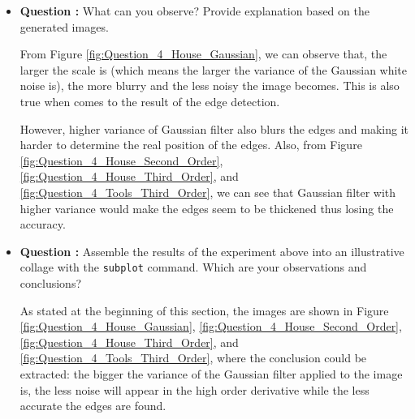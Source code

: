 \documentclass[11pt,a4paper]{article}
\begin{document}
	\begin{itemize}
		\item\addtocounter{Counter}{1}\textbf{Question :} What can you observe? Provide explanation based on the generated images.
			\par From Figure \ref{fig:Question_4_House_Gaussian}, we can observe that, the larger the scale is (which means the larger the variance of the Gaussian white noise is), the more blurry and the less noisy the image becomes. This is also true when comes to the result of the edge detection. 
			\par However, higher variance of Gaussian filter also blurs the edges and making it harder to determine the real position of the edges. Also, from Figure \ref{fig:Question_4_House_Second_Order}, \ref{fig:Question_4_House_Third_Order}, and \ref{fig:Question_4_Tools_Third_Order}, we can see that Gaussian filter with higher variance would make the edges seem to be thickened thus losing the accuracy.

		\item\addtocounter{Counter}{1}\textbf{Question :} Assemble the results of the experiment above into an illustrative collage with the \texttt{subplot} command. Which are your observations and conclusions?
			\par As stated at the beginning of this section, the images are shown in Figure \ref{fig:Question_4_House_Gaussian}, \ref{fig:Question_4_House_Second_Order}, \ref{fig:Question_4_House_Third_Order}, and \ref{fig:Question_4_Tools_Third_Order}, where the conclusion could be extracted: the bigger the variance of the Gaussian filter applied to the image is, the less noise will appear in the high order derivative while the less accurate the edges are found.


\end{itemize}
\end{document}
